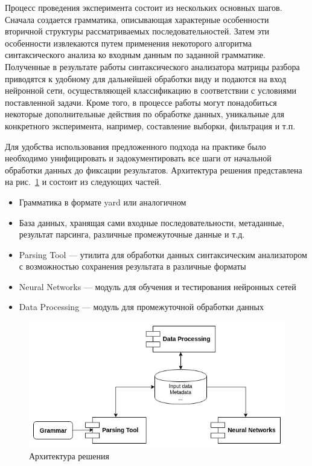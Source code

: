 \documentclass[14pt]{matmex-diploma-custom}
\begin{document}
Процесс проведения эксперимента состоит из нескольких основных шагов. Сначала создается грамматика, описывающая характерные особенности вторичной структуры рассматриваемых последовательностей. Затем эти особенности извлекаются путем применения некоторого алгоритма синтаксического анализа ко входным данным по заданной грамматике. Полученные в результате работы синтаксического анализатора матрицы разбора приводятся к удобному для дальнейшей обработки виду и подаются на вход нейронной сети, осуществляющей классификацию в соответствии с условиями поставленной задачи. Кроме того, в процессе работы могут понадобиться некоторые дополнительные действия по обработке данных, уникальные для конкретного эксперимента, например, составление выборки, фильтрация и т.п.

Для удобства использования предложенного подхода на практике было необходимо унифицировать и задокументировать все шаги от начальной обработки данных до фиксации результатов. Архитектура решения представлена на рис.~\ref{arch} и состоит из следующих частей.
\begin{itemize}
    \item Грамматика в формате yard или аналогичном
    \item База данных, хранящая сами входные последовательности, метаданные, результат парсинга, различные промежуточные данные и т.д.
    \item Parsing Tool --- утилита для обработки данных синтаксическим анализатором с возможностью сохранения результата в различные форматы
    \item Neural Networks --- модуль для обучения и тестирования нейронных сетей
    \item Data Processing --- модуль для промежуточной обработки данных
\end{itemize}

\begin{figure}[h]
\begin{center}
\centering
\includegraphics[width=12cm]{arch.png}
\caption{Архитектура решения}
\label{arch}
\end{center}
\end{figure}    
\end{document}
